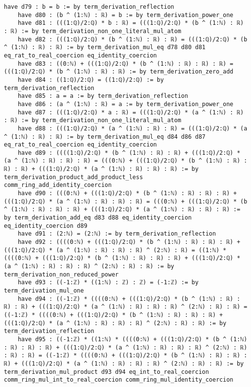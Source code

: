 \documentclass{article}
\begin{document}
\begin{tcolorbox}[colback=white!10, width=\linewidth]
\begin{lstlisting}[language=Lean4]
    have d79 : b = b := by term_derivation_reflection
    have d80 : (b ^ (1:ℕ) : ℝ) = b := by term_derivation_power_one
    have d81 : (((1:ℚ)/2:ℚ) * b : ℝ) = (((1:ℚ)/2:ℚ) * (b ^ (1:ℕ) : ℝ) : ℝ) := by term_derivation_non_one_literal_mul_atom
    have d82 : (((1:ℚ)/2:ℚ) * (b ^ (1:ℕ) : ℝ) : ℝ) = (((1:ℚ)/2:ℚ) * (b ^ (1:ℕ) : ℝ) : ℝ) := by term_derivation_mul_eq d78 d80 d81 eq_rat_to_real_coercion eq_identity_coercion
    have d83 : ((0:ℕ) + (((1:ℚ)/2:ℚ) * (b ^ (1:ℕ) : ℝ) : ℝ) : ℝ) = (((1:ℚ)/2:ℚ) * (b ^ (1:ℕ) : ℝ) : ℝ) := by term_derivation_zero_add
    have d84 : ((1:ℚ)/2:ℚ) = ((1:ℚ)/2:ℚ) := by term_derivation_reflection
    have d85 : a = a := by term_derivation_reflection
    have d86 : (a ^ (1:ℕ) : ℝ) = a := by term_derivation_power_one
    have d87 : (((1:ℚ)/2:ℚ) * a : ℝ) = (((1:ℚ)/2:ℚ) * (a ^ (1:ℕ) : ℝ) : ℝ) := by term_derivation_non_one_literal_mul_atom
    have d88 : (((1:ℚ)/2:ℚ) * (a ^ (1:ℕ) : ℝ) : ℝ) = (((1:ℚ)/2:ℚ) * (a ^ (1:ℕ) : ℝ) : ℝ) := by term_derivation_mul_eq d84 d86 d87 eq_rat_to_real_coercion eq_identity_coercion
    have d89 : ((((1:ℚ)/2:ℚ) * (b ^ (1:ℕ) : ℝ) : ℝ) + (((1:ℚ)/2:ℚ) * (a ^ (1:ℕ) : ℝ) : ℝ) : ℝ) = (((0:ℕ) + (((1:ℚ)/2:ℚ) * (b ^ (1:ℕ) : ℝ) : ℝ) : ℝ) + (((1:ℚ)/2:ℚ) * (a ^ (1:ℕ) : ℝ) : ℝ) : ℝ) := by term_derivation_product_add_product_less comm_ring_add_identity_coercion
    have d90 : (((0:ℕ) + (((1:ℚ)/2:ℚ) * (b ^ (1:ℕ) : ℝ) : ℝ) : ℝ) + (((1:ℚ)/2:ℚ) * (a ^ (1:ℕ) : ℝ) : ℝ) : ℝ) = (((0:ℕ) + (((1:ℚ)/2:ℚ) * (b ^ (1:ℕ) : ℝ) : ℝ) : ℝ) + (((1:ℚ)/2:ℚ) * (a ^ (1:ℕ) : ℝ) : ℝ) : ℝ) := by term_derivation_add_eq d83 d88 eq_identity_coercion eq_identity_coercion d89
    have d91 : (2:ℕ) = (2:ℕ) := by term_derivation_reflection
    have d92 : ((((0:ℕ) + (((1:ℚ)/2:ℚ) * (b ^ (1:ℕ) : ℝ) : ℝ) : ℝ) + (((1:ℚ)/2:ℚ) * (a ^ (1:ℕ) : ℝ) : ℝ) : ℝ) ^ (2:ℕ) : ℝ) = ((1:ℕ) * ((((0:ℕ) + (((1:ℚ)/2:ℚ) * (b ^ (1:ℕ) : ℝ) : ℝ) : ℝ) + (((1:ℚ)/2:ℚ) * (a ^ (1:ℕ) : ℝ) : ℝ) : ℝ) ^ (2:ℕ) : ℝ) : ℝ) := by term_derivation_non_reduced_power
    have d93 : ((-1:ℤ) * ((1:ℕ) : ℤ) : ℤ) = (-1:ℤ) := by term_derivation_mul_one
    have d94 : ((-1:ℤ) * ((((0:ℕ) + (((1:ℚ)/2:ℚ) * (b ^ (1:ℕ) : ℝ) : ℝ) : ℝ) + (((1:ℚ)/2:ℚ) * (a ^ (1:ℕ) : ℝ) : ℝ) : ℝ) ^ (2:ℕ) : ℝ) : ℝ) = ((-1:ℤ) * ((((0:ℕ) + (((1:ℚ)/2:ℚ) * (b ^ (1:ℕ) : ℝ) : ℝ) : ℝ) + (((1:ℚ)/2:ℚ) * (a ^ (1:ℕ) : ℝ) : ℝ) : ℝ) ^ (2:ℕ) : ℝ) : ℝ) := by term_derivation_reflection
    have d95 : ((-1:ℤ) * ((1:ℕ) * ((((0:ℕ) + (((1:ℚ)/2:ℚ) * (b ^ (1:ℕ) : ℝ) : ℝ) : ℝ) + (((1:ℚ)/2:ℚ) * (a ^ (1:ℕ) : ℝ) : ℝ) : ℝ) ^ (2:ℕ) : ℝ) : ℝ) : ℝ) = ((-1:ℤ) * ((((0:ℕ) + (((1:ℚ)/2:ℚ) * (b ^ (1:ℕ) : ℝ) : ℝ) : ℝ) + (((1:ℚ)/2:ℚ) * (a ^ (1:ℕ) : ℝ) : ℝ) : ℝ) ^ (2:ℕ) : ℝ) : ℝ) := by term_derivation_mul_product d93 d94 eq_int_to_real_coercion comm_ring_mul_int_to_real_coercion comm_ring_mul_identity_coercion

\end{lstlisting}
\end{tcolorbox}
\end{document}
